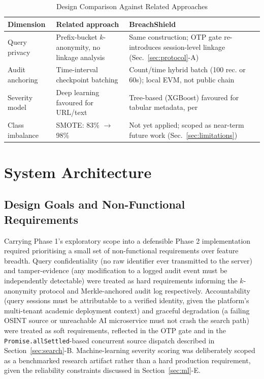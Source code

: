 \documentclass[conference]{IEEEtran}
\begin{document}
\begin{table}[htbp]
\caption{Design Comparison Against Related Approaches}
\label{tab:comparison}
\centering
\scriptsize
\begin{tabular}{lp{2.6cm}p{2.8cm}}
\toprule
\textbf{Dimension} & \textbf{Related approach} & \textbf{BreachShield} \\
\midrule
Query privacy & Prefix-bucket $k$-anonymity, no linkage analysis \cite{li2019protocols} & Same construction; OTP gate re-introduces session-level linkage (Sec.~\ref{sec:protocol}-A) \\
Audit anchoring & Time-interval checkpoint batching \cite{arabnouri2024secure} & Count/time hybrid batch (100 rec. or 60s); local EVM, not public chain \\
Severity model & Deep learning favoured for URL/text \cite{sahingoz2024dephides} & Tree-based (XGBoost) favoured for tabular metadata, per \cite{grinsztajn2022why} \\
Class imbalance & SMOTE: 83\% $\to$ 98\% \cite{alsubaei2024enhancing} & Not yet applied; scoped as near-term future work (Sec.~\ref{sec:limitations}) \\
\bottomrule
\end{tabular}
\end{table}

\section{System Architecture}
\label{sec:arch}

\subsection{Design Goals and Non-Functional Requirements}
Carrying Phase 1's exploratory scope into a defensible Phase 2 implementation required prioritising a small set of non-functional requirements over feature breadth. Query confidentiality (no raw identifier ever transmitted to the server) and tamper-evidence (any modification to a logged audit event must be independently detectable) were treated as hard requirements informing the $k$-anonymity protocol and Merkle-anchored audit log respectively. Accountability (query sessions must be attributable to a verified identity, given the platform's multi-tenant academic deployment context) and graceful degradation (a failing OSINT source or unreachable AI microservice must not crash the search path) were treated as soft requirements, reflected in the OTP gate and in the \texttt{Promise.allSettled}-based concurrent source dispatch described in Section~\ref{sec:search}-B. Machine-learning severity scoring was deliberately scoped as a benchmarked research artifact rather than a hard production requirement, given the reliability constraints discussed in Section~\ref{sec:ml}-E.
\end{document}

